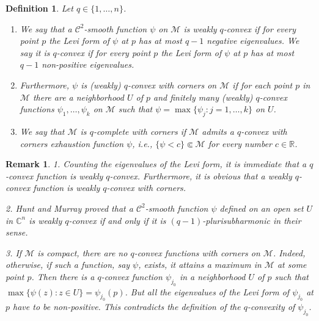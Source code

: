 \documentclass[11pt,a4paper]{article}
\newtheorem{rem}[lem]{Remark}
\newtheorem{defn}[lem]{Definition}
\newcommand{\CC}{\mathbb{C}}
\newcommand{\RR}{\mathbb{R}}
\newcommand{\Ccal}{\mathcal{C}}
\newcommand{\Mcal}{\mathcal{M}}
\begin{document}
\begin{defn} Let $q\in\{1,\ldots,n\}$.

\begin{enumerate}

\item We say that a $\Ccal^2$-smooth function $\psi$ on $\Mcal$ is \emph{weakly $q$-convex} if for every point $p$ the Levi form of $\psi$ at $p$ has at most $q-1$ negative eigenvalues. We say it is \emph{$q$-convex} if for every point $p$ the Levi form of $\psi$ at $p$ has at most $q-1$ non-positive eigenvalues. 

\item Furthermore, $\psi$ is \emph{(weakly) $q$-convex with corners} on $\Mcal$ if for each point $p$ in $\Mcal$ there are a neighborhood $U$ of $p$ and finitely many (weakly) $q$-convex functions $\psi_1,\ldots,\psi_k$ on $\Mcal$ such that $\psi=\max\{\psi_j:j=1,\ldots,k\}$ on $U$.

\item We say that $\Mcal$ is \emph{$q$-complete with corners} if $\Mcal$ admits a $q$-convex with corners exhaustion function $\psi$, i.e., $\{ \psi < c\} \Subset \Mcal$ for every number $c \in \RR$. 

\end{enumerate}

\end{defn}

\begin{rem}\label{rem-qvx-fcts} 1. Counting the eigenvalues of the Levi form, it is immediate that a $q$-convex function is weakly $q$-convex. Furthermore, it is obvious that a weakly $q$-convex function is weakly $q$-convex with corners.

\medskip

2. Hunt and Murray \cite{HM} proved that a $\Ccal^2$-smooth function $\psi$ defined on an open set $U$ in $\CC^n$ is weakly $q$-convex if and only if it is \emph{$(q-1)$-plurisubharmonic} in their sense.

\medskip 

3. If $\Mcal$ is compact, there are no $q$-convex functions with corners on $\Mcal$. Indeed, otherwise, if such a function, say $\psi$, exists, it attains a maximum in $\Mcal$ at some point $p$. Then there is a $q$-convex function $\psi_{j_0}$ in a neighborhood $U$ of $p$ such that $\max\{\psi(z): z \in U\}=\psi_{j_0}(p)$. But all the eigenvalues of the Levi form of $\psi_{j_0}$ at $p$ have to be non-positive. This contradicts the definition of the $q$-convexity of $\psi_{j_0}$.

\end{rem}
\end{document}
